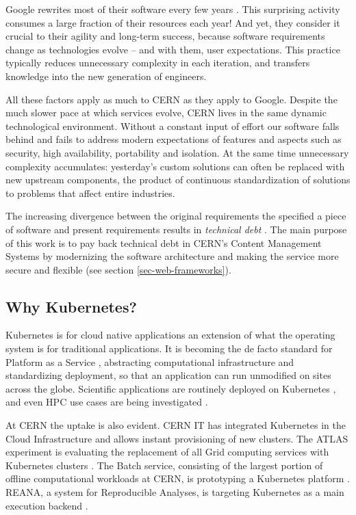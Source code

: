 Google rewrites most of their software every few years \cite{henderson_software_2020}.
This surprising activity consumes a large fraction of their resources each year!
And yet, they consider it crucial to their agility and long-term success, because software requirements change as technologies evolve -- and with them, user expectations.
This practice typically reduces unnecessary complexity in each iteration,
and transfers knowledge into the new generation of engineers.

All these factors apply as much to CERN as they apply to Google.
Despite the much slower pace at which services evolve, CERN lives in the same dynamic technological environment.
Without a constant input of effort our software falls behind and fails to address modern expectations
of features and aspects such as security, high availability, portability and isolation.
At the same time unnecessary complexity accumulates:
yesterday's custom solutions can often be replaced with new upstream components,
the product of continuous standardization of solutions to problems that affect entire industries.

The increasing divergence between the original requirements the specified a piece of software and present requirements
results in \emph{technical debt} \cite{fairbanks_ur-technical_2020}.
The main purpose of this work is to pay back technical debt in CERN's Content Management Systems by modernizing the software architecture
and making the service more secure and flexible (see section \ref{sec-web-frameworks}).


\subsection{Why Kubernetes?}

Kubernetes is for cloud native applications an extension of what the operating system is for traditional applications.
It is becoming the de facto standard for Platform as a Service \cite{kaviani_towards_2019}, abstracting computational infrastructure and standardizing deployment,
so that an application can run unmodified on sites across the globe.
Scientific applications are routinely deployed on Kubernetes \cite{banek_why_2019, hariri_batch_2018, yuan_bioinformatics_2020},
and even HPC use cases are being investigated \cite{beltre_enabling_2019}.

At CERN the uptake is also evident.
CERN IT has integrated Kubernetes in the Cloud Infrastructure and allows instant provisioning of new clusters.
The ATLAS experiment is evaluating the replacement of all Grid computing services with Kubernetes clusters \cite{megino_using_2020}.
The Batch service, consisting of the largest portion of offline computational workloads at CERN, is prototyping a Kubernetes platform \cite{alvarez_managing_2020}.
REANA, a system for Reproducible Analyses, is targeting Kubernetes as a main execution backend \cite{simko_reana_2019}.

